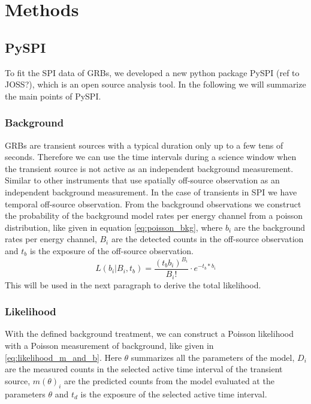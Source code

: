 \documentclass[twocolumn]{article}%
\begin{document}
\section{Methods}
\subsection{PySPI}
\label{pyspi}
To fit the SPI data of GRBs, we developed a new python package PySPI (ref to JOSS?), which is an open source analysis tool. In the following we will summarize the main points of PySPI.

\subsubsection*{Background}

GRBs are transient sources with a typical duration only up to a few tens of seconds.
Therefore we can use the time intervals during a science window when the transient source is not active as an independent background measurement. Similar to other instruments that use spatially off-source observation as an independent background measurement. In the case of transients in SPI we have temporal off-source observation. From the background observations we construct the probability of the background model rates per energy channel from a poisson distribution, like given in equation \ref{eq:poisson_bkg}, where $b_{i}$ are the background rates per energy channel, $B_{i}$ are the detected counts in the off-source observation and $t_{b}$ is the exposure of the off-source observation.
\begin{equation}
	L(b_{i}|B_{i}, t_{b})=\frac{(t_{b} b_{i})^{B_{i}}}{B_{i}!}\cdot e^{-t_{b}*b_{i}}
  \label{eq:poisson_bkg}
\end{equation}
This will be used in the next paragraph to derive the total likelihood.

\subsubsection*{Likelihood}

With the defined background treatment, we can construct a Poisson likelihood with a Poisson measurement of background, like given in \ref{eq:likelihood_m_and_b}. Here $\theta$ summarizes all the parameters of the model, $D_{i}$ are the measured counts in the selected active time interval of the transient source, $m(\theta)_{i}$ are the predicted counts from the model evaluated at the parameters $\theta$ and $t_{d}$ is the exposure of the selected active time interval.
\end{document}
